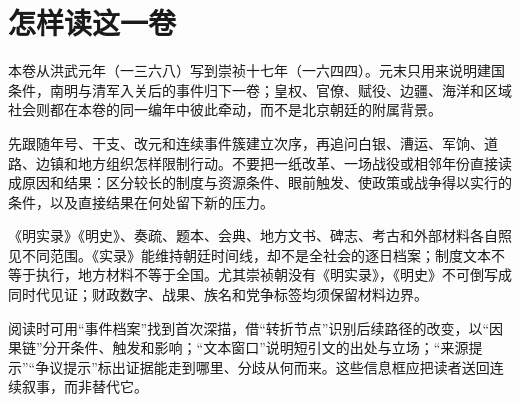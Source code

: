 \chapter*{怎样读这一卷}

本卷从洪武元年（一三六八）写到崇祯十七年（一六四四）。元末只用来说明建国条件，南明与清军入关后的事件归下一卷；皇权、官僚、赋役、边疆、海洋和区域社会则都在本卷的同一编年中彼此牵动，而不是北京朝廷的附属背景。

先跟随年号、干支、改元和连续事件簇建立次序，再追问白银、漕运、军饷、道路、边镇和地方组织怎样限制行动。不要把一纸改革、一场战役或相邻年份直接读成原因和结果：区分较长的制度与资源条件、眼前触发、使政策或战争得以实行的条件，以及直接结果在何处留下新的压力。

《明实录》《明史》、奏疏、题本、会典、地方文书、碑志、考古和外部材料各自照见不同范围。《实录》能维持朝廷时间线，却不是全社会的逐日档案；制度文本不等于执行，地方材料不等于全国。尤其崇祯朝没有《明实录》，《明史》不可倒写成同时代见证；财政数字、战果、族名和党争标签均须保留材料边界。

阅读时可用“事件档案”找到首次深描，借“转折节点”识别后续路径的改变，以“因果链”分开条件、触发和影响；“文本窗口”说明短引文的出处与立场；“来源提示”“争议提示”标出证据能走到哪里、分歧从何而来。这些信息框应把读者送回连续叙事，而非替代它。
